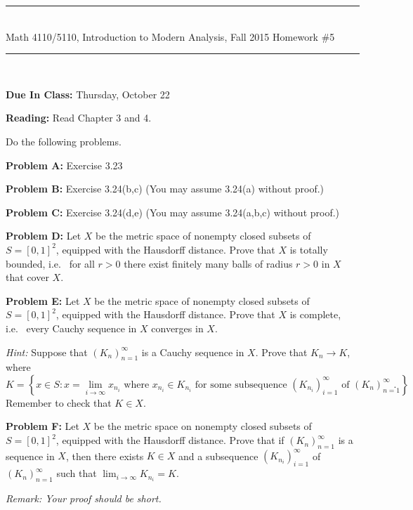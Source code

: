 \documentclass[11pt,reqno]{amsart}
\newcommand{\spacer}{\vspace{.4cm}}
\begin{document}
\begin{center}
\hrule \ \\
\large \textsf{Math 4110/5110, Introduction to Modern Analysis, Fall 2015} \hfill
\Large Homework \#5 \vspace{.25cm} \hrule \
\end{center}

\spacer

\textbf{Due In Class:} Thursday, October 22  \spacer

\textbf{Reading:} Read Chapter 3 and 4.  \spacer

Do the following problems. \spacer

\textbf{Problem A:} Exercise 3.23 \spacer

\textbf{Problem B:} Exercise 3.24(b,c) (You may assume 3.24(a) without proof.) \spacer

\textbf{Problem C:} Exercise 3.24(d,e) (You may assume 3.24(a,b,c) without proof.) \spacer

\textbf{Problem D:} Let $X$ be the metric space of nonempty closed subsets of $S=[0,1]^2$, equipped with the Hausdorff distance. Prove that $X$ is totally bounded, i.e.~ for all $r>0$ there exist finitely many balls of radius $r>0$ in $X$ that cover $X$. \spacer

\textbf{Problem E:} Let $X$ be the metric space of nonempty closed subsets of $S=[0,1]^2$, equipped with the Hausdorff distance. Prove that $X$ is complete, i.e.~ every Cauchy sequence in $X$ converges in $X$.

\emph{Hint:} Suppose that $(K_n)_{n=1}^\infty$ is a Cauchy sequence in $X$. Prove that $K_n\rightarrow K$, where $$K=\left\{x\in S:x=\lim_{i\rightarrow\infty}x_{n_i}\text{ where }x_{n_i}\in K_{n_i} \text{ for some subsequence $(K_{n_i})_{i=1}^\infty$ of $(K_n)_{n=1}^\infty$}\right\}.$$ Remember to check that $K\in X$. \spacer

\textbf{Problem F:} Let $X$ be the metric space on nonempty closed subsets of $S=[0,1]^2$, equipped with the Hausdorff distance. Prove that if $(K_n)_{n=1}^\infty$ is a sequence in $X$, then there exists $K\in X$ and a subsequence $(K_{n_i})_{i=1}^\infty$ of $(K_n)_{n=1}^\infty$ such that $\lim_{i\rightarrow\infty} K_{n_i}=K$.

 \emph{Remark: Your proof should be short.}
\end{document}
